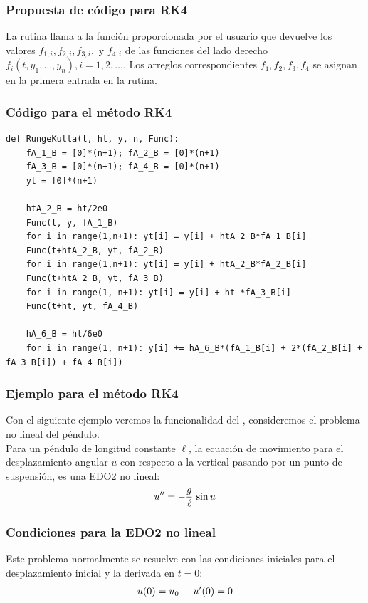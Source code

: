 \begin{frame}
\frametitle{Propuesta de código para RK4}
La rutina llama a la función proporcionada por el usuario  que devuelve los valores $f_{1,i}, f_{2,i}, f_{3,i},$ y $f_{4,i}$ de las funciones del lado derecho $f_{i} (t,  y_{1}, \ldots, y_{n}), i = 1, 2, \ldots$. Los arreglos correspondientes $f_{1}, f_{2}, f_{3}, f_{4}$ se asignan en la primera entrada en la rutina.
\end{frame}
\begin{frame}
\frametitle{Código para el método RK4}
\begin{lstlisting}[caption=Código para el método RK4, style=codigopython]
def RungeKutta(t, ht, y, n, Func):
    fA_1_B = [0]*(n+1); fA_2_B = [0]*(n+1)
    fA_3_B = [0]*(n+1); fA_4_B = [0]*(n+1)
    yt = [0]*(n+1)
 
    htA_2_B = ht/2e0
    Func(t, y, fA_1_B)
    for i in range(1,n+1): yt[i] = y[i] + htA_2_B*fA_1_B[i]
    Func(t+htA_2_B, yt, fA_2_B)
    for i in range(1,n+1): yt[i] = y[i] + htA_2_B*fA_2_B[i]
    Func(t+htA_2_B, yt, fA_3_B)
    for i in range(1, n+1): yt[i] = y[i] + ht *fA_3_B[i]
    Func(t+ht, yt, fA_4_B)
 
    hA_6_B = ht/6e0
    for i in range(1, n+1): y[i] += hA_6_B*(fA_1_B[i] + 2*(fA_2_B[i] + fA_3_B[i]) + fA_4_B[i]) 
\end{lstlisting}
\end{frame}
\begin{frame}
\frametitle{Ejemplo para el método RK4}
Con el siguiente ejemplo veremos la funcionalidad del , consideremos el problema no lineal del péndulo.
\\
\bigskip
\pause
Para un péndulo de longitud constante $\ell$, la ecuación de movimiento para el desplazamiento angular $u$ con respecto a la vertical pasando por un punto de suspensión, es una EDO2 no lineal:
\begin{align}
{u}^{\prime \prime} = - \dfrac{g}{\ell} \, \sin u
\label{eq:ecuacion_12_39}
\end{align}
\end{frame}
\begin{frame}
\frametitle{Condiciones para la EDO2 no lineal}
Este problema normalmente se resuelve con las condiciones iniciales para el desplazamiento inicial y la derivada en $t = 0$:
\begin{align}
u(0) = u_{0} \hspace{0.5cm} {u}^{\prime}(0) = 0
\label{eq:ecuacion_12_40}
\end{align}
\end{frame}

